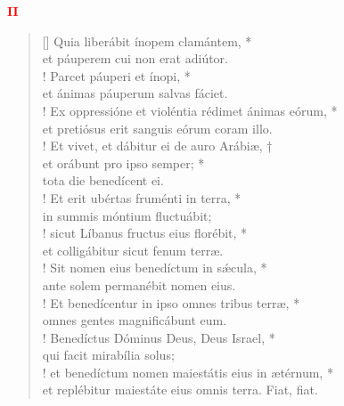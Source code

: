 \begin{center}
\textcolor{red}{\bf II}
\end{center}
\begin{verse}[\versewidth]
Quia liberábit ínopem clamántem, *\\
et páuperem cui non erat adiútor.\\!
\vin Parcet páuperi et ínopi, *\\
\vin et ánimas páuperum salvas fáciet.\\!
Ex oppressióne et violéntia rédimet ánimas eórum, *\\
et pretiósus erit sanguis eórum coram illo.\\!
\vin Et vivet, et dábitur ei de auro Arábiæ, †\\
\vin et orábunt pro ipso semper; *\\
\vin tota die benedícent ei.\\!
Et erit ubértas fruménti in terra, *\\
in summis móntium fluctuábit;\\!
\vin sicut Líbanus fructus eius florébit, *\\
\vin et colligábitur sicut fenum terræ.\\!
Sit nomen eius benedíctum in s\'{æ}cula, *\\
ante solem permanébit nomen eius.\\!
\vin Et benedícentur in ipso omnes tribus terræ, *\\
\vin omnes gentes magnificábunt eum.\\!
Benedíctus Dóminus Deus, Deus Israel, *\\
qui facit mirabília solus;\\!
\vin et benedíctum nomen maiestátis eius in ætérnum, *\\
\vin et replébitur maiestáte eius omnis terra. Fiat, fiat.\\
\end{verse}
\vspace{1cm}


